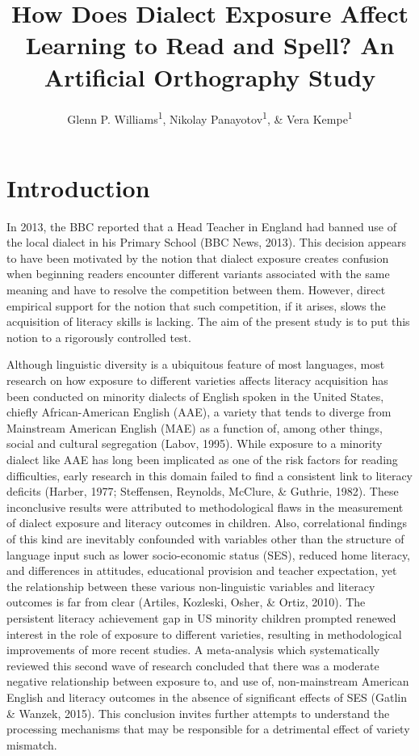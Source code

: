 \documentclass[doc,floatsintext]{apa6}
\title{How Does Dialect Exposure Affect Learning to Read and Spell? An
Artificial Orthography Study}
\author{Glenn P. Williams\textsuperscript{1}, Nikolay
Panayotov\textsuperscript{1}, \& Vera Kempe\textsuperscript{1}}
\date{}
\affiliation{
\vspace{0.5cm}
\textsuperscript{1} Abertay University}
\begin{document}
\maketitle

\section{Introduction}\label{introduction}

In 2013, the BBC reported that a Head Teacher in England had banned use
of the local dialect in his Primary School (BBC News, 2013). This
decision appears to have been motivated by the notion that dialect
exposure creates confusion when beginning readers encounter different
variants associated with the same meaning and have to resolve the
competition between them. However, direct empirical support for the
notion that such competition, if it arises, slows the acquisition of
literacy skills is lacking. The aim of the present study is to put this
notion to a rigorously controlled test.

Although linguistic diversity is a ubiquitous feature of most languages,
most research on how exposure to different varieties affects literacy
acquisition has been conducted on minority dialects of English spoken in
the United States, chiefly African-American English (AAE), a variety
that tends to diverge from Mainstream American English (MAE) as a
function of, among other things, social and cultural segregation (Labov,
1995). While exposure to a minority dialect like AAE has long been
implicated as one of the risk factors for reading difficulties, early
research in this domain failed to find a consistent link to literacy
deficits (Harber, 1977; Steffensen, Reynolds, McClure, \& Guthrie,
1982). These inconclusive results were attributed to methodological
flaws in the measurement of dialect exposure and literacy outcomes in
children. Also, correlational findings of this kind are inevitably
confounded with variables other than the structure of language input
such as lower socio-economic status (SES), reduced home literacy, and
differences in attitudes, educational provision and teacher expectation,
yet the relationship between these various non-linguistic variables and
literacy outcomes is far from clear (Artiles, Kozleski, Osher, \& Ortiz,
2010). The persistent literacy achievement gap in US minority children
prompted renewed interest in the role of exposure to different
varieties, resulting in methodological improvements of more recent
studies. A meta-analysis which systematically reviewed this second wave
of research concluded that there was a moderate negative relationship
between exposure to, and use of, non-mainstream American English and
literacy outcomes in the absence of significant effects of SES (Gatlin
\& Wanzek, 2015). This conclusion invites further attempts to understand
the processing mechanisms that may be responsible for a detrimental
effect of variety mismatch.
\end{document}
